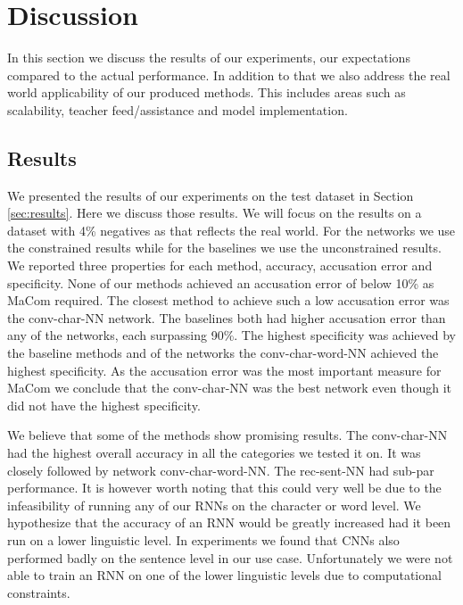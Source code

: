 \section{Discussion} \label{sec:discussion}

In this section we discuss the results of our experiments, our expectations
compared to the actual performance. In addition to that we also address the
real world applicability of our produced methods. This includes areas such as
scalability, teacher feed/assistance and model implementation.


\subsection{Results}

We presented the results of our experiments on the test dataset in Section
\ref{sec:results}. Here we discuss those results. We will focus on the results
on a dataset with 4\% negatives as that reflects the real world. For the
networks we use the constrained results while for the baselines we use the
unconstrained results. We reported three properties for each method, accuracy,
accusation error and specificity. None of our methods achieved an accusation
error of below 10\% as MaCom required. The closest method to achieve such a low
accusation error was the \gls{conv-char-NN} network. The baselines both had
higher accusation error than any of the networks, each surpassing 90\%.
The highest specificity was achieved by the baseline methods and of the
networks the \gls{conv-char-word-NN} achieved the highest specificity. As the
accusation error was the most important measure for MaCom we conclude that the
\gls{conv-char-NN} was the best network even though it did not have the highest
specificity.

We believe that some of the methods show promising results. The
\gls{conv-char-NN} had the highest overall accuracy in all the categories we
tested it on. It was closely followed by network \gls{conv-char-word-NN}. The
\gls{rec-sent-NN} had sub-par performance. It is however worth noting that this
could very well be due to the infeasibility of running any of our \glspl{RNN} on
the character or word level. We hypothesize that the accuracy of an \gls{RNN}
would be greatly increased had it been run on a lower linguistic level. In
experiments we found that \glspl{CNN} also performed badly on the sentence level
in our use case. Unfortunately we were not able to train an \gls{RNN} on one of
the lower linguistic levels due to computational constraints.

